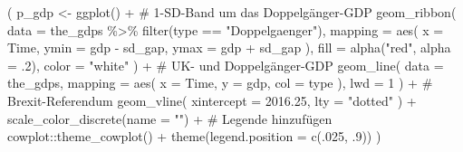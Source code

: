 \documentclass[
  a4paper,
  DIV=11,
  oneside]{scrreprt}
\newenvironment{Shaded}{\begin{snugshade}}{\end{snugshade}}
\newcommand{\AttributeTok}[1]{\textcolor[rgb]{0.40,0.45,0.13}{#1}}
\newcommand{\CommentTok}[1]{\textcolor[rgb]{0.37,0.37,0.37}{#1}}
\newcommand{\DecValTok}[1]{\textcolor[rgb]{0.68,0.00,0.00}{#1}}
\newcommand{\FloatTok}[1]{\textcolor[rgb]{0.68,0.00,0.00}{#1}}
\newcommand{\FunctionTok}[1]{\textcolor[rgb]{0.28,0.35,0.67}{#1}}
\newcommand{\NormalTok}[1]{\textcolor[rgb]{0.00,0.23,0.31}{#1}}
\newcommand{\OtherTok}[1]{\textcolor[rgb]{0.00,0.23,0.31}{#1}}
\newcommand{\SpecialCharTok}[1]{\textcolor[rgb]{0.37,0.37,0.37}{#1}}
\newcommand{\StringTok}[1]{\textcolor[rgb]{0.13,0.47,0.30}{#1}}
\begin{document}
\begin{Shaded}
\begin{Highlighting}[]
\NormalTok{(}
\NormalTok{  p\_gdp }\OtherTok{\textless{}{-}} \FunctionTok{ggplot}\NormalTok{() }\SpecialCharTok{+}
    \CommentTok{\# 1{-}SD{-}Band um das Doppelgänger{-}GDP}
    \FunctionTok{geom\_ribbon}\NormalTok{(}
      \AttributeTok{data =}\NormalTok{ the\_gdps }\SpecialCharTok{\%\textgreater{}\%} 
        \FunctionTok{filter}\NormalTok{(type }\SpecialCharTok{==} \StringTok{"Doppelgaenger"}\NormalTok{), }
      \AttributeTok{mapping =} \FunctionTok{aes}\NormalTok{(}
        \AttributeTok{x =}\NormalTok{ Time, }
        \AttributeTok{ymin =}\NormalTok{ gdp }\SpecialCharTok{{-}}\NormalTok{ sd\_gap, }
        \AttributeTok{ymax =}\NormalTok{ gdp }\SpecialCharTok{+}\NormalTok{ sd\_gap}
\NormalTok{      ), }
      \AttributeTok{fill =} \FunctionTok{alpha}\NormalTok{(}\StringTok{"red"}\NormalTok{, }\AttributeTok{alpha =}\NormalTok{ .}\DecValTok{2}\NormalTok{), }
      \AttributeTok{color =} \StringTok{"white"}
\NormalTok{    ) }\SpecialCharTok{+}
    \CommentTok{\# UK{-} und Doppelgänger{-}GDP}
    \FunctionTok{geom\_line}\NormalTok{(}
      \AttributeTok{data =}\NormalTok{ the\_gdps, }
      \AttributeTok{mapping =} \FunctionTok{aes}\NormalTok{(}
        \AttributeTok{x =}\NormalTok{ Time, }
        \AttributeTok{y =}\NormalTok{ gdp, }
        \AttributeTok{col =}\NormalTok{ type}
\NormalTok{      ),}
      \AttributeTok{lwd =} \DecValTok{1}
\NormalTok{    ) }\SpecialCharTok{+}
    \CommentTok{\# Brexit{-}Referendum}
    \FunctionTok{geom\_vline}\NormalTok{(}
      \AttributeTok{xintercept =} \FloatTok{2016.25}\NormalTok{, }
      \AttributeTok{lty =} \StringTok{"dotted"}
\NormalTok{    ) }\SpecialCharTok{+}
    \FunctionTok{scale\_color\_discrete}\NormalTok{(}\AttributeTok{name =} \StringTok{""}\NormalTok{) }\SpecialCharTok{+}
    \CommentTok{\# Legende hinzufügen}
\NormalTok{    cowplot}\SpecialCharTok{::}\FunctionTok{theme\_cowplot}\NormalTok{() }\SpecialCharTok{+}
    \FunctionTok{theme}\NormalTok{(}\AttributeTok{legend.position =} \FunctionTok{c}\NormalTok{(.}\DecValTok{025}\NormalTok{, .}\DecValTok{9}\NormalTok{))  }
\NormalTok{)}
\end{Highlighting}
\end{Shaded}
\end{document}
